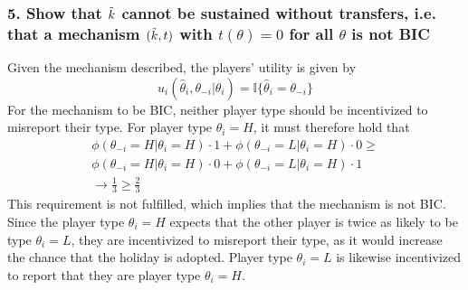 \documentclass[a4paper]{article}
\begin{document}
	\subsubsection*{5. Show that $\Tilde{k}$ cannot be sustained without transfers, i.e. that a mechanism $(\Tilde{k},t)$ with $t(\theta)=0$ for all $\theta$ is not BIC}
	Given the mechanism described, the players' utility is given by
	\begin{equation}
		u_{i}(\hat{\theta}_{i}, \theta_{-i}|\theta_{i})=\mathbb{I}\{\hat{\theta}_{i}=\theta_{-i}\}
	\end{equation}
	For the mechanism to be BIC, neither player type should be incentivized to misreport their type. For player type $\theta_{i}=H$, it must therefore hold that
	\begin{align}
		\phi(\theta_{-i}=H|\theta_{i}=H)\cdot 1 + \phi(\theta_{-i}=L|\theta_{i}=H)\cdot 0 \geq \nonumber\\
		\phi(\theta_{-i}=H|\theta_{i}=H)\cdot 0 + \phi(\theta_{-i}=L|\theta_{i}=H)\cdot 1\\
		\rightarrow \frac{1}{3} \geq \frac{2}{3}
	\end{align}
	This requirement is not fulfilled, which implies that the mechanism is not BIC. Since the player type $\theta_{i}=H$ expects that the other player is twice as likely to be type $\theta_{i}=L$, they are incentivized to misreport their type, as it would increase the chance that the holiday is adopted. Player type $\theta_{i}=L$ is likewise incentivized to report that they are player type $\theta_{i}=H$.
	
	
\end{document}
